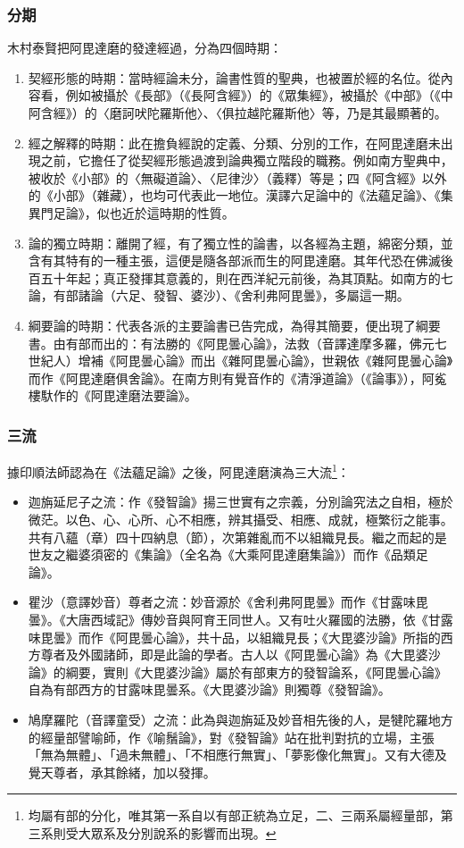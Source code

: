 \subsubsection{分期}
木村泰賢把阿毘達磨的發達經過，分為四個時期：
\begin{enumerate}
  \item 契經形態的時期：當時經論未分，論書性質的聖典，也被置於經的名位。從內容看，例如被攝於《長部》（《長阿含經》）的《眾集經》，被攝於《中部》（《中阿含經》）的〈磨訶吠陀羅斯他〉、〈俱拉越陀羅斯他〉等，乃是其最顯著的。
  \item 經之解釋的時期：此在擔負經說的定義、分類、分別的工作，在阿毘達磨未出現之前，它擔任了從契經形態過渡到論典獨立階段的職務。例如南方聖典中，被收於《小部》的〈無礙道論〉、〈尼律沙〉（義釋）等是；四《阿含經》以外的《小部》（雜藏），也均可代表此一地位。漢譯六足論中的《法蘊足論》、《集異門足論》，似也近於這時期的性質。
  \item 論的獨立時期：離開了經，有了獨立性的論書，以各經為主題，綿密分類，並含有其特有的一種主張，這便是隨各部派而生的阿毘達磨。其年代恐在佛滅後百五十年起；真正發揮其意義的，則在西洋紀元前後，為其頂點。如南方的七論，有部諸論（六足、發智、婆沙）、《舍利弗阿毘曇》，多屬這一期。
  \item 綱要論的時期：代表各派的主要論書已告完成，為得其簡要，便出現了綱要書。由有部而出的：有法勝的《阿毘曇心論》，法救（音譯達摩多羅，佛元七世紀人）增補《阿毘曇心論》而出《雜阿毘曇心論》，世親依《雜阿毘曇心論》而作《阿毘達磨俱舍論》。在南方則有覺音作的《清淨道論》（《論事》），阿㝹樓馱作的《阿毘達磨法要論》。
\end{enumerate}

\subsubsection{三流}
據印順法師認為在《法蘊足論》之後，阿毘達磨演為三大流\footnote{均屬有部的分化，唯其第一系自以有部正統為立足，二、三兩系屬經量部，第三系則受大眾系及分別說系的影響而出現。}：
\begin{itemize}
  \item 迦旃延尼子之流：作《發智論》揚三世實有之宗義，分別論究法之自相，極於微茫。以色、心、心所、心不相應，辨其攝受、相應、成就，極繁衍之能事。共有八蘊（章）四十四納息（節），次第雜亂而不以組織見長。繼之而起的是世友之繼婆須密的《集論》（全名為《大乘阿毘達磨集論》）而作《品類足論》。
  \item 瞿沙（意譯妙音）尊者之流：妙音源於《舍利弗阿毘曇》而作《甘露味毘曇》。《大唐西域記》傳妙音與阿育王同世人。又有吐火羅國的法勝，依《甘露味毘曇》而作《阿毘曇心論》，共十品，以組織見長；《大毘婆沙論》所指的西方尊者及外國諸師，即是此論的學者。古人以《阿毘曇心論》為《大毘婆沙論》的綱要，實則《大毘婆沙論》屬於有部東方的發智論系，《阿毘曇心論》自為有部西方的甘露味毘曇系。《大毘婆沙論》則獨尊《發智論》。
  \item 鳩摩羅陀（音譯童受）之流：此為與迦旃延及妙音相先後的人，是犍陀羅地方的經量部譬喻師，作《喻鬚論》，對《發智論》站在批判對抗的立場，主張「無為無體」、「過未無體」、「不相應行無實」、「夢影像化無實」。又有大德及覺天尊者，承其餘緒，加以發揮。
\end{itemize}


